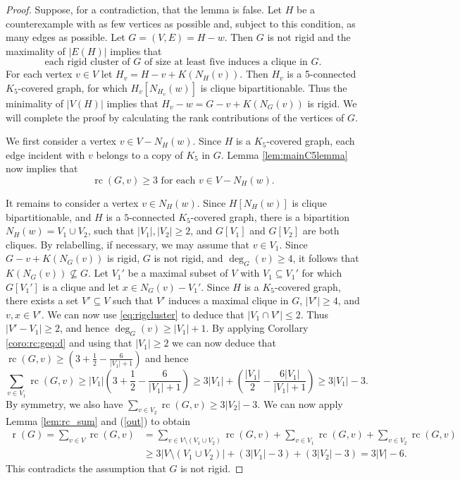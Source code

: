 \documentclass[11pt,a4paper]{article}
\theoremstyle{definition}
\DeclareMathOperator{\rr}{r}
\DeclareMathOperator{\rc}{rc}
\begin{document}
\begin{proof}
    Suppose, for a contradiction, that the lemma is false. Let $H$ be a counterexample with as few vertices as possible and, subject to this condition, as many edges as possible.
    Let $G=(V,E)=H-w$. Then $G$ is not rigid and
    the maximality of $|E(H)|$ implies that
    \begin{equation}\label{eq:rigcluster}
        \mbox{each rigid cluster of $G$ of size at least five induces a clique in $G$.}
    \end{equation}
    For each vertex $v\in V$ let $H_v=H-v+K(N_{H}(v))$. Then $H_v$ is a 5-connected $K_5$-covered graph, for which $H_v[N_{H_v}(w)]$ is clique bipartitionable.
    Thus the minimality  of $|V(H)|$ implies that  $H_v-w=G-v+K(N_G(v))$ is rigid.  
    We will complete the proof by calculating the rank contributions of the vertices of $G$.
    
    We first consider a vertex $v\in V-N_{H}(w)$.
    Since $H$ is a $K_5$-covered graph, 
    each edge incident with $v$ belongs to a copy of $K_5$ in $G$.
    Lemma \ref{lem:mainC5lemma} now implies that 
    \begin{equation}
        \label{out}
        \mbox{$\rc(G,v)\geq 3$   for each $v\in V-N_{H}(w)$.}
    \end{equation}
    
It remains to consider a vertex  $v\in N_H(w)$. 
    Since $H[N_{H}(w)]$
    is clique bipartitionable, and $H$ is a $5$-connected $K_5$-covered graph,
    there is a bipartition 
    $N_H(w)=V_1\cup V_2$, such that $|V_1|,|V_2|\geq 2$,
    and $G[V_1]$ and $G[V_2]$ are both cliques.
    By relabelling, if necessary, we may assume that $v\in V_1$.
    Since $G-v+K(N_G(v))$ is rigid, $G$ is not rigid, and $\deg_G(v)\geq 4$,
    it follows that
    $K(N_G(v))\not\subseteq G$. 
    Let $V_1'$ be a maximal subset of $V$ with $V_1\subseteq V_1'$ for which
    $G[V_1']$ is a clique and let $x\in N_G(v)-V_1'$.
    Since $H$ is a $K_5$-covered graph, 
    there exists a set $V'\subseteq V$ such that $V'$ induces a maximal clique in $G$,  $|V'|\geq 4$, and  $v,x\in V'$.
    We can now use \eqref{eq:rigcluster} to deduce that $|V_1\cap V'|\leq 2$.
    Thus $|V'-V_1|\geq 2$, and hence 
    $\deg_G(v)\geq |V_1|+1$. 
By applying
    Corollary \ref{coro:rc:geq:d}
    and using that $|V_1|\geq 2$ we can now deduce that
$\rc(G,v)\geq \left(3+\frac{1}{2}-\frac{6}{|V_1|+1}\right)$ and hence
$$\sum_{v\in V_1}\rc(G,v)\geq |V_1|\left(3+\frac{1}{2}-\frac{6}{|V_1|+1}\right)\geq 3|V_1|+\left(\frac{|V_1|}{2}-\frac{6|V_1|}{|V_1|+1}\right) \geq 3|V_1|-3.$$
    By symmetry, we also have $\sum_{v\in V_2}\rc(G,v)\geq 3|V_2|-3.$
    We can now apply Lemma \ref{lem:rc_sum} and (\ref{out}) to obtain
    \begin{align*}
        \rr(G)=\sum _{v\in V}\rc(G,v)&= \sum_{v\in V\setminus (V_1\cup V_2)}\rc(G,v)+\sum_{v\in V_1}\rc(G,v)+\sum_{v\in V_2}\rc(G,v)\\
        &\geq  3|V\setminus (V_1\cup V_2)| + \left(3|V_1|-3\right)+\left(3|V_2|-3\right)= 3|V|-6.
    \end{align*}
    This contradicts the assumption that $G$ is not rigid.
\end{proof}
\end{document}

